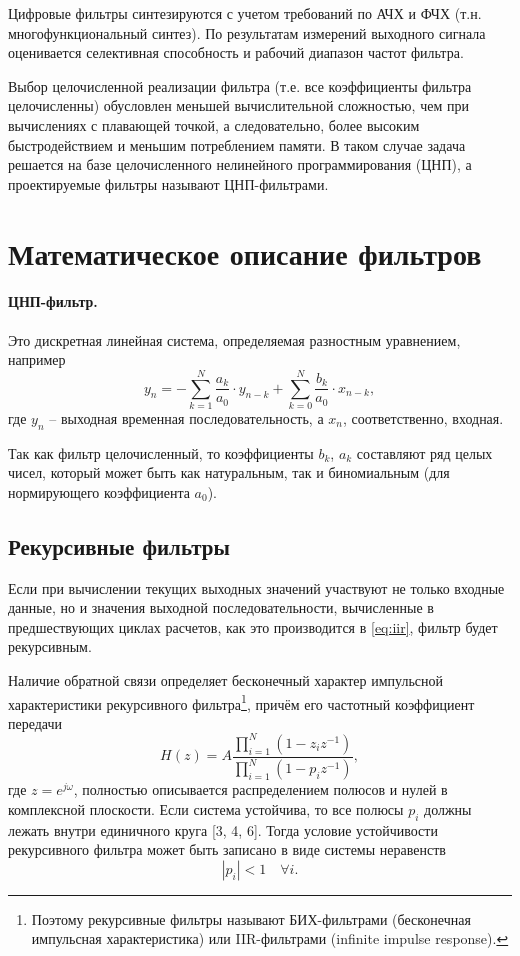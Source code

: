 \documentclass[a4paper,14pt]{extarticle}
\begin{document}
Цифровые фильтры синтезируются с учетом требований по АЧХ и ФЧХ (т.н. многофункциональный синтез). По результатам измерений выходного сигнала оценивается селективная способность и рабочий диапазон частот фильтра.

Выбор целочисленной реализации фильтра (т.е. все коэффициенты фильтра целочисленны) обусловлен меньшей вычислительной сложностью, чем при вычислениях с плавающей точкой, а следовательно, более высоким быстродействием и меньшим потреблением памяти. В таком случае задача решается на базе целочисленного нелинейного программирования (ЦНП), а проектируемые фильтры называют ЦНП-фильтрами.

\section{Математическое описание фильтров}
\paragraph{ЦНП-фильтр. } Это дискретная линейная система, определяемая разностным уравнением, например
\begin{equation}
  y_{n}=-\sum_{k=1}^{N} \frac{a_{k}}{a_{0}} \cdot y_{n-k}+\sum_{k=0}^{N} \frac{b_{k}}{a_{0}} \cdot x_{n-k},
  \label{eq:iir}
\end{equation}
где $y_{n}$ -- выходная временная последовательность, а $x_{n}$, соответственно, входная.

Так как фильтр целочисленный, то коэффициенты $b_k$, $a_k$ составляют ряд целых чисел, который может быть как натуральным, так и биномиальным (для нормирующего коэффициента $a_0$).

\subsection{Рекурсивные фильтры} Если при вычислении текущих выходных значений участвуют не только входные данные, но и значения выходной последовательности, вычисленные в предшествующих циклах расчетов, как это производится в \eqref{eq:iir}, фильтр будет рекурсивным. 

Наличие обратной связи определяет бесконечный характер импульсной характеристики рекурсивного фильтра\footnote{Поэтому рекурсивные фильтры называют БИХ-фильтрами (бесконечная импульсная характеристика) или IIR-фильтрами (infinite impulse response).}, причём его частотный коэффициент передачи
\begin{equation}
  H\left(z\right)=A \frac{\prod_{i=1}^{N}\left(1-z_{i} z^{-1}\right)}{\prod_{i=1}^{N}\left(1-p_{i} z^{-1}\right)},
\end{equation}
где $z=e^{j \omega}$, полностью описывается распределением полюсов и нулей в комплексной плоскости. Если система устойчива, то все полюсы  $p_i$  должны лежать внутри единичного круга [3, 4, 6]. Тогда условие устойчивости рекурсивного фильтра может быть записано в виде системы неравенств
\begin{equation}
  |p_i|<1 \quad \forall i.
\end{equation}
\end{document}
